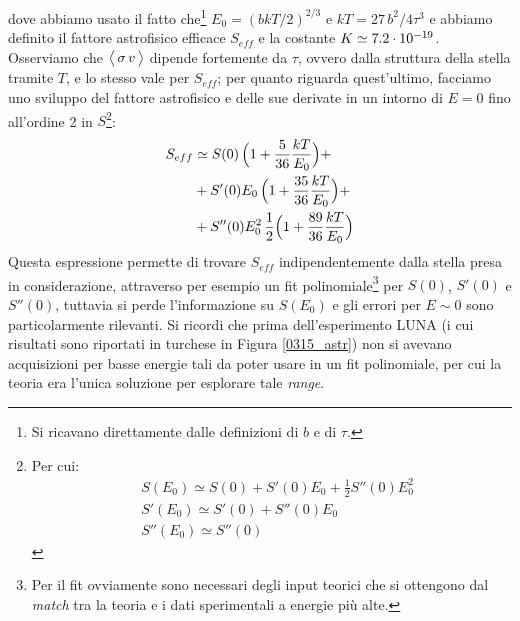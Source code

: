 dove abbiamo usato il fatto che\footnote{Si ricavano direttamente dalle definizioni di $b$ e di $\tau$.} $E_0 = (bkT/2)^{2/3}$ e $kT = 27\,b^2/4\tau^3$ e abbiamo definito il fattore astrofisico efficace $S_{eff}$ e la costante $K\simeq 7.2\cdot10^{-19}$. Osserviamo che $\bigl\langle\, \sigma\,v\, \bigr\rangle$ dipende fortemente da $\tau$, ovvero dalla struttura della stella tramite $T$, e lo stesso vale per $S_{eff}$; per quanto riguarda quest'ultimo, facciamo uno sviluppo del fattore astrofisico e delle sue derivate in un intorno di $E=0$ fino all'ordine 2 in $S$\footnote{Per cui:%
\begin{displaymath}%
\begin{aligned}%
&S(E_0)   \simeq S(0) + S'(0) E_0 + \frac{1}{2} S''(0) E_0^2 \\ 
&S'(E_0)  \simeq  S'(0)  + S''(0) E_0 \\ 
&S''(E_0) \simeq  S''(0)
\end{aligned}%
\end{displaymath}%
}:
\begin{displaymath}
\begin{aligned}
S_{eff} &\simeq S(0)\, \Bigl ( 1+\frac{5}{36}\frac{kT}{E_0} \Bigr ) +\\
&+ S'(0) E_0\, \Bigl ( 1+\frac{35}{36}\frac{kT}{E_0} \Bigr ) +\\
&+ S''(0) E_0^2\, \frac{1}{2} \Bigl ( 1+\frac{89}{36}\frac{kT}{E_0} \Bigr )
\end{aligned}
\end{displaymath}
Questa espressione permette di trovare $S_{eff}$ indipendentemente dalla stella presa in considerazione, attraverso per esempio un fit polinomiale\footnote{Per  il fit ovviamente sono necessari degli input teorici che si ottengono dal \textit{match} tra la teoria e i dati sperimentali a energie più alte.} per $S(0)$, $S'(0)$ e $S''(0)$, tuttavia si perde l'informazione su $S(E_0)$ e gli errori per $E\sim0$ sono particolarmente rilevanti. 
Si ricordi che prima dell'esperimento LUNA (i cui risultati sono riportati in turchese in Figura \ref{0315_astr}) non si avevano acquisizioni per basse energie tali da poter usare in un fit polinomiale, per cui la teoria era l'unica soluzione per esplorare tale \textit{range}.






